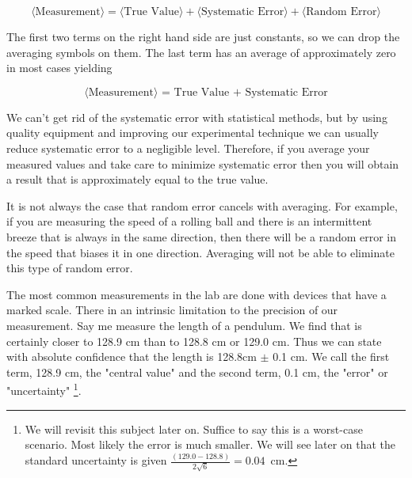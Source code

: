 \[\langle \textrm{Measurement} \rangle  = \langle\textrm{True Value}\rangle + \langle\textrm{Systematic Error}\rangle + \langle\textrm{Random Error}\rangle \]

The first two terms on the right hand side are just constants, so we can drop the averaging symbols on them. The last term has an average of approximately zero in most cases yielding

\[\langle \textrm{Measurement} \rangle \textrm{ = True Value + Systematic Error}\]

We can't get rid of the systematic error with statistical methods, but by using quality equipment and improving our experimental technique we can usually reduce systematic error to a negligible level. Therefore, if you average your measured values and take care to minimize systematic error then you will obtain a result that is approximately equal to the true value.

It is not always the case that random error cancels with averaging. For example, if you are measuring the speed of a rolling ball and there is an intermittent breeze that is always in the same direction, then there will be a random error in the speed that biases it in one direction. Averaging will not be able to eliminate this type of random error. 

The most common measurements in the lab are done with devices that have a marked scale. There in an intrinsic limitation to the precision of our measurement. Say me measure the length of a pendulum. We find that is certainly closer to 128.9 cm than to 128.8 cm or 129.0 cm. Thus we can state with absolute confidence that the length is 128.8cm $\pm$ 0.1 cm. We call the first term, 128.9 cm, the "central value" and the second term, 0.1 cm, the "error" or "uncertainty" \footnote{We will revisit this subject later on.  Suffice to say this is a worst-case scenario. Most likely the error is much smaller. We will see later on that the standard uncertainty is given $\frac{(129.0-128.8)}{2\sqrt{6}}=0.04$~cm.}.

